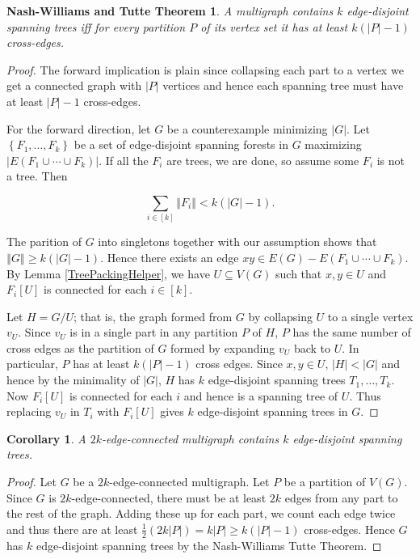 \documentclass[12pt]{article}
\theoremstyle{plain}
\newtheorem{cor}[thm]{Corollary}
\newtheorem*{NashWilliamsTutte}{Nash-Williams and Tutte Theorem}
\theoremstyle{definition}
\theoremstyle{remark}
\newcommand{\set}[1]{\left\{ #1 \right\}}
\newcommand{\card}[1]{\left|#1\right|}
\newcommand{\size}[1]{\left\Vert#1\right\Vert}
\begin{document}
\begin{NashWilliamsTutte}
A multigraph contains $k$ edge-disjoint spanning trees iff for every partition $P$ of its vertex set it has at least $k(\card{P} - 1)$ cross-edges.
\end{NashWilliamsTutte}
\begin{proof}
The forward implication is plain since collapsing each part to a vertex we get a connected graph with $\card{P}$ vertices and hence each spanning tree must have at least $\card{P} - 1$ cross-edges.

For the forward direction, let $G$ be a counterexample minimizing $\card{G}$.  Let $\set{F_1, \ldots, F_k}$ be a set of edge-disjoint spanning forests in $G$ maximizing $\card{E(F_1 \cup \cdots \cup F_k)}$.  If all the $F_i$ are trees, we are done, so assume some $F_i$ is not a tree.  Then

\[\sum_{i \in [k]} \size{F_i} < k(\card{G} - 1).\]

The parition of $G$ into singletons together with our assumption shows that $\size{G} \geq k(\card{G} - 1)$.  Hence there exists an edge $xy \in E(G) - E(F_1 \cup \cdots \cup F_k)$.  By Lemma \ref{TreePackingHelper}, we have $U \subseteq V(G)$ such that $x,y \in U$ and $F_i[U]$ is connected for each $i \in [k]$.  

Let $H = G/U$; that is, the graph formed from $G$ by collapsing $U$ to a single vertex $v_U$.  Since $v_U$ is in a single part in any partition $P$ of $H$, $P$ has the same number of cross edges as the partition of $G$ formed by expanding $v_U$ back to $U$.  In particular, $P$ has at least $k(\card{P} - 1)$ cross edges.  Since $x, y \in U$, $\card{H} < \card{G}$ and hence by the minimality of $\card{G}$, $H$ has $k$ edge-disjoint spanning trees $T_1, \ldots, T_k$.  Now $F_i[U]$ is connected for each $i$ and hence is a spanning tree of $U$. Thus replacing $v_U$ in $T_i$ with $F_i[U]$ gives $k$ edge-disjoint spanning trees in $G$.
\end{proof}

\begin{cor}
A $2k$-edge-connected multigraph contains $k$ edge-disjoint spanning trees.
\end{cor}
\begin{proof}
Let $G$ be a $2k$-edge-connected multigraph.  Let $P$ be a partition of $V(G)$.  Since $G$ is $2k$-edge-connected, there must be at least $2k$ edges from any part to the rest of the graph. Adding these up for each part, we count each edge twice and thus there are at least $\frac12 (2k\card{P}) = k\card{P} \geq k(\card{P} - 1)$ cross-edges.  Hence $G$ has $k$ edge-disjoint spanning trees by the Nash-Williams Tutte Theorem.
\end{proof}
\end{document}
